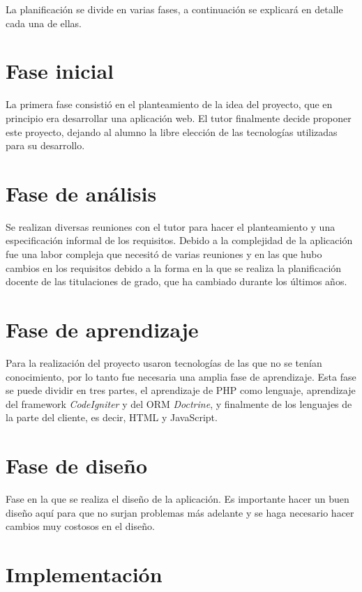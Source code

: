 
La planificación se divide en varias fases, a continuación se explicará en detalle cada una de ellas.

\section{Fase inicial}

La primera fase consistió en el planteamiento de la idea del proyecto, que en principio era desarrollar una aplicación web. El tutor finalmente decide proponer este proyecto, dejando al alumno la libre elección de las tecnologías utilizadas para su desarrollo.

\section{Fase de análisis}

Se realizan diversas reuniones con el tutor para hacer el planteamiento y una especificación informal de los requisitos. Debido a la complejidad de la aplicación fue una labor compleja que necesitó de varias reuniones y en las que hubo cambios en los requisitos debido a la forma en la que se realiza la planificación docente de las titulaciones de grado, que ha cambiado durante los últimos años.

\section{Fase de aprendizaje}

Para la realización del proyecto usaron tecnologías de las que no se tenían conocimiento, por lo tanto fue necesaria una amplia fase de aprendizaje. Esta fase se puede dividir en tres partes, el aprendizaje de PHP como lenguaje, aprendizaje del framework {\em CodeIgniter} y del ORM {\em Doctrine}, y finalmente de los lenguajes de la parte del cliente, es decir, HTML y JavaScript.

\section{Fase de diseño}

Fase en la que se realiza el diseño de la aplicación. Es importante hacer un buen diseño aquí para que no surjan problemas más adelante y se haga necesario hacer cambios muy costosos en el diseño.

\section{Implementación}

